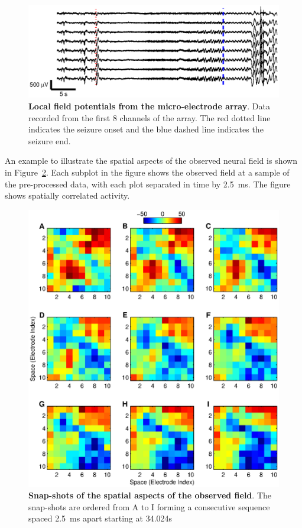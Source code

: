 \documentclass[]{article}
\begin{document}
\begin{figure}[!ht]
\begin{center}
\includegraphics{./Figures/LFPs.eps}
\end{center}
\caption{{\bf Local field potentials from the micro-electrode array}. Data recorded from the first 8 channels of the array. The red dotted line indicates the seizure onset and the blue dashed line indicates the seizure end.}
\label{fig:TimeSeries}
\end{figure}

An example to illustrate the spatial aspects of the observed neural field is shown in Figure~\ref{fig:FieldObserations}. Each subplot in the figure shows the observed field at a sample of the pre-processed data, with each plot separated in time by 2.5~ms. The figure shows spatially correlated activity.

\begin{figure}[!ht]
\begin{center}
\includegraphics{./Figures/FieldObservations.eps}
\end{center}
\caption{{\bf Snap-shots of the spatial aspects of the observed field}. The snap-shots are ordered from A to I forming a consecutive sequence spaced 2.5~ms apart starting at 34.024s}
\label{fig:FieldObserations}
\end{figure}
\end{document}
